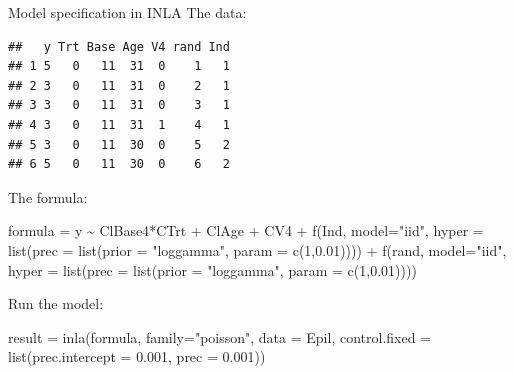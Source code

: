 \documentclass[
  ignorenonframetext,
]{beamer}
\newenvironment{Shaded}{\begin{snugshade}}{\end{snugshade}}
\newcommand{\AttributeTok}[1]{\textcolor[rgb]{0.77,0.63,0.00}{#1}}
\newcommand{\DecValTok}[1]{\textcolor[rgb]{0.00,0.00,0.81}{#1}}
\newcommand{\FloatTok}[1]{\textcolor[rgb]{0.00,0.00,0.81}{#1}}
\newcommand{\FunctionTok}[1]{\textcolor[rgb]{0.00,0.00,0.00}{#1}}
\newcommand{\NormalTok}[1]{#1}
\newcommand{\OtherTok}[1]{\textcolor[rgb]{0.56,0.35,0.01}{#1}}
\newcommand{\SpecialCharTok}[1]{\textcolor[rgb]{0.00,0.00,0.00}{#1}}
\newcommand{\StringTok}[1]{\textcolor[rgb]{0.31,0.60,0.02}{#1}}
\begin{document}
\begin{frame}[fragile]{Model specification in INLA}
\protect\hypertarget{model-specification-in-inla}{}
The data: \tiny

\begin{verbatim}
##   y Trt Base Age V4 rand Ind
## 1 5   0   11  31  0    1   1
## 2 3   0   11  31  0    2   1
## 3 3   0   11  31  0    3   1
## 4 3   0   11  31  1    4   1
## 5 3   0   11  30  0    5   2
## 6 5   0   11  30  0    6   2
\end{verbatim}

\normalsize

The formula: \footnotesize

\begin{Shaded}
\begin{Highlighting}[]
\NormalTok{formula }\OtherTok{=}\NormalTok{ y }\SpecialCharTok{\textasciitilde{}}\NormalTok{ ClBase4}\SpecialCharTok{*}\NormalTok{CTrt }\SpecialCharTok{+}\NormalTok{ ClAge }\SpecialCharTok{+}\NormalTok{ CV4 }\SpecialCharTok{+}
              \FunctionTok{f}\NormalTok{(Ind, }\AttributeTok{model=}\StringTok{"iid"}\NormalTok{,}
                 \AttributeTok{hyper =} \FunctionTok{list}\NormalTok{(}\AttributeTok{prec =} \FunctionTok{list}\NormalTok{(}\AttributeTok{prior =} \StringTok{"loggamma"}\NormalTok{,}
                 \AttributeTok{param =} \FunctionTok{c}\NormalTok{(}\DecValTok{1}\NormalTok{,}\FloatTok{0.01}\NormalTok{)))) }\SpecialCharTok{+}
              \FunctionTok{f}\NormalTok{(rand, }\AttributeTok{model=}\StringTok{"iid"}\NormalTok{,}
                \AttributeTok{hyper =} \FunctionTok{list}\NormalTok{(}\AttributeTok{prec =} \FunctionTok{list}\NormalTok{(}\AttributeTok{prior =} \StringTok{"loggamma"}\NormalTok{, }
                                         \AttributeTok{param =} \FunctionTok{c}\NormalTok{(}\DecValTok{1}\NormalTok{,}\FloatTok{0.01}\NormalTok{))))}
\end{Highlighting}
\end{Shaded}

\normalsize

Run the model: \footnotesize

\begin{Shaded}
\begin{Highlighting}[]
\NormalTok{result }\OtherTok{=} \FunctionTok{inla}\NormalTok{(formula, }\AttributeTok{family=}\StringTok{"poisson"}\NormalTok{, }\AttributeTok{data =}\NormalTok{ Epil,}
              \AttributeTok{control.fixed =} \FunctionTok{list}\NormalTok{(}\AttributeTok{prec.intercept =} \FloatTok{0.001}\NormalTok{,}
                                   \AttributeTok{prec =} \FloatTok{0.001}\NormalTok{))}
\end{Highlighting}
\end{Shaded}

\normalsize
\end{frame}
\end{document}
